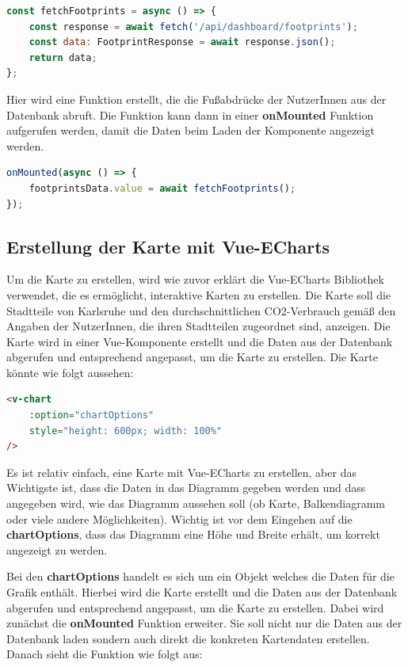 \begin{lstlisting}[language={JavaScript}, caption={Laden der Fußabdrücke der NutzerInnen}]
const fetchFootprints = async () => {
    const response = await fetch('/api/dashboard/footprints');
    const data: FootprintResponse = await response.json();
    return data;
};
\end{lstlisting}

Hier wird eine Funktion erstellt, die die Fußabdrücke der NutzerInnen aus der Datenbank abruft. Die Funktion kann dann in einer \textbf{onMounted} Funktion aufgerufen werden, damit die Daten beim Laden der Komponente angezeigt werden.

\begin{lstlisting}[language={JavaScript}, caption={Bei laden der Komponente die Fußabdrücke der NutzerInnen speichern}]
onMounted(async () => {
    footprintsData.value = await fetchFootprints();
});
\end{lstlisting}

\subsection{Erstellung der Karte mit Vue-ECharts}

Um die Karte zu erstellen, wird wie zuvor erklärt die Vue-ECharts Bibliothek verwendet, die es ermöglicht, interaktive Karten zu erstellen. Die Karte soll die Stadtteile von Karlsruhe und den durchschnittlichen CO2-Verbrauch gemäß den Angaben der NutzerInnen, die ihren Stadtteilen zugeordnet sind, anzeigen. Die Karte wird in einer Vue-Komponente erstellt und die Daten aus der Datenbank abgerufen und entsprechend angepasst, um die Karte zu erstellen. Die Karte könnte wie folgt aussehen:

\begin{lstlisting}[language={html}, caption={Vue-ECharts Diagramm Beispiel}]
<v-chart
    :option="chartOptions"
    style="height: 600px; width: 100%"
/>
\end{lstlisting}

Es ist relativ einfach, eine Karte mit Vue-ECharts zu erstellen, aber das Wichtigste ist, dass die Daten in das Diagramm gegeben werden und dass angegeben wird, wie das Diagramm aussehen soll (ob Karte, Balkendiagramm oder viele andere Möglichkeiten). Wichtig ist vor dem Eingehen auf die \textbf{chartOptions}, dass das Diagramm eine Höhe und Breite erhält, um korrekt angezeigt zu werden.

Bei den \textbf{chartOptions} handelt es sich um ein Objekt welches die Daten für die Grafik enthält. Hierbei wird die Karte erstellt und die Daten aus der Datenbank abgerufen und entsprechend angepasst, um die Karte zu erstellen. Dabei wird zunächst die \textbf{onMounted} Funktion erweiter. Sie soll nicht nur die Daten aus der Datenbank laden sondern auch direkt die konkreten Kartendaten erstellen. Danach sieht die Funktion wie folgt aus:

